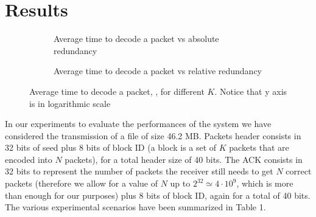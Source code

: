 \section{Results}\label{sec:results}
\setlength{\abovecaptionskip}{0pt plus 0pt minus 2pt}



\begin{figure}[t!]
\centering
\captionsetup{justification=centering,font=scriptsize}
\begin{subfigure}{0.4\textwidth}
	\captionsetup{justification=centering,font=scriptsize}
	\setlength{}
	\setlength{}
	
	\caption{Average time to decode a packet vs absolute redundancy}
	\label{fig:decoding_time}
\end{subfigure}\hspace{2em}%
\begin{subfigure}{0.4\textwidth}
	\captionsetup{justification=centering,font=scriptsize}
	\setlength{}
	\setlength{}
	
	\caption{Average time to decode a packet vs relative redundancy}
	\label{fig:decoding_time_rel}
\end{subfigure}
\caption{Average time to decode a packet, , for different $K$. Notice that y axis is in logarithmic scale}
\label{fig:dc_all}
\end{figure}

In our experiments to evaluate the performances of the system we have considered the transmission of a file of size 46.2 MB. Packets header consists in 32 bits of seed plus 8 bits of block ID (a block is a set of $K$ packets that are encoded into $N$ packets), for a total header size of 40 bits. The ACK consists in 32 bits to represent the number of packets the receiver still needs to get $N$ correct packets (therefore we allow for a value of $N$ up to $2^{32}\simeq 4\cdot 10^9$, which is more than enough for our purposes) plus 8 bits of block ID, again for a total of 40 bits. The various experimental scenarios have been summarized in Table 1.

